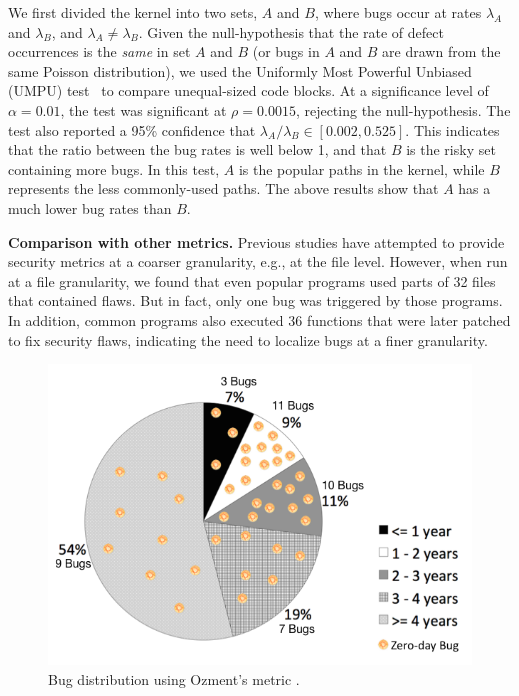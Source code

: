 We first divided the kernel into two sets,
$A$ and $B$, where bugs occur at rates $\lambda_A$ and
$\lambda_B$, and $\lambda_A \neq \lambda_B$. Given the null-hypothesis
that the rate of defect occurrences is the \textit{same} in set $A$ and $B$
(or bugs in $A$ and $B$ are drawn from the same Poisson distribution),
we used the Uniformly Most Powerful Unbiased (UMPU) test~\cite{shiue1982experiment}
to compare unequal-sized code blocks.
At a significance level of $\alpha=0.01$, the test was significant at
$\rho=0.0015$, rejecting the null-hypothesis.
The test also reported a 95\% confidence that $\lambda_A / \lambda_B
\in [0.002, 0.525]$. This indicates that the ratio between the bug rates is well
below 1, and that $B$ is the risky set containing more bugs.
In this test, $A$ is the popular paths in the kernel, while $B$
represents the less commonly-used paths. The above results show that
$A$ has a much lower bug rates than $B$.

\textbf{Comparison with other metrics.}
Previous studies have attempted to provide security metrics at a coarser granularity,
e.g., at the file level. However, when run at a file
granularity, we found that even popular programs used parts of
32 files that contained flaws. But in fact, only one bug was triggered by those programs. 
In addition, common programs also executed 36 functions that were later patched to fix security
flaws, indicating the need to localize bugs at a finer granularity.

\begin{figure}
\centering
\includegraphics[width=1.0\columnwidth]{diagram/metrics_age.png}
\caption{\small Bug distribution using Ozment's metric \cite{ozment2006milk}.}
\label{fig:metrics_age}
\end{figure}

